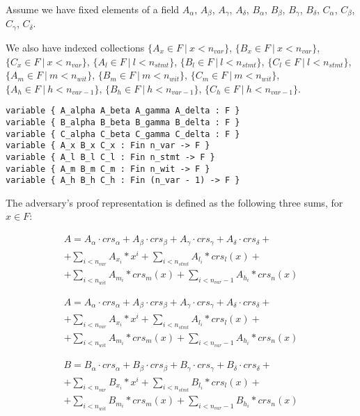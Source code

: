\documentclass{article}
\theoremstyle{definition}
\theoremstyle{remark}
\begin{document}
Assume we have fixed elements of a field $A_{\alpha}$, $A_{\beta}$, $A_{\gamma}$, $A_{\delta}$, $B_{\alpha}$, $B_{\beta}$, $B_{\gamma}$, $B_{\delta}$, $C_{\alpha}$, $C_{\beta}$, $C_{\gamma}$, $C_{\delta}$.

We also have indexed collections $\{ A_x \in F \: | \: x < n_{var} \}$, $\{ B_x \in F \: | \: x < n_{var} \}$, $\{ C_x \in F \: | \: x < n_{var} \}$, $\{ A_l \in F \: | \: l < n_{stmt} \}$, $\{ B_l \in F \: | \: l < n_{stmt} \}$, $\{ C_l \in F \: | \: l < n_{stmt} \}$, $\{ A_m \in F \: | \: m < n_{wit} \}$, $\{ B_m \in F \: | \: m < n_{wit} \}$, $\{ C_m \in F \: | \: m < n_{wit} \}$, $\{ A_h \in F \: | \: h < n_{var - 1} \}$, $\{ B_h \in F \: | \: h < n_{var - 1} \}$, $\{ C_h \in F \: | \: h < n_{var - 1} \}$.

\begin{lstlisting}
variable { A_alpha A_beta A_gamma A_delta : F }
variable { B_alpha B_beta B_gamma B_delta : F }
variable { C_alpha C_beta C_gamma C_delta : F }
variable { A_x B_x C_x : Fin n_var -> F }
variable { A_l B_l C_l : Fin n_stmt -> F }
variable { A_m B_m C_m : Fin n_wit -> F }
variable { A_h B_h C_h : Fin (n_var - 1) -> F }
\end{lstlisting}

The adversary's proof representation is defined as the following three sums, for $x \in F$:

\begin{multline}
A = A_{\alpha} \cdot crs_{\alpha} + A_{\beta} \cdot crs_{\beta} + A_{\gamma} \cdot crs_{\gamma} + A_{\delta} \cdot crs_{\delta} + \\
    + \sum \limits_{i < n_{var}} A_{x_i} * x^i + \sum \limits_{i < n_{stmt}} A_{l_i} * crs_l(x) + \\
    + \sum \limits_{i < n_{wit}} A_{m_i} * crs_m(x) + \sum \limits_{i < n_{var} - 1} A_{h_i} * crs_n(x)
\end{multline}

\begin{multline}
A = A_{\alpha} \cdot crs_{\alpha} + A_{\beta} \cdot crs_{\beta} + A_{\gamma} \cdot crs_{\gamma} + A_{\delta} \cdot crs_{\delta} + \\
    + \sum \limits_{i < n_{var}} A_{x_i} * x^i + \sum \limits_{i < n_{stmt}} A_{l_i} * crs_l(x) + \\
    + \sum \limits_{i < n_{wit}} A_{m_i} * crs_m(x) + \sum \limits_{i < n_{var} - 1} A_{h_i} * crs_n(x)
\end{multline}

\begin{multline}
B = B_{\alpha} \cdot crs_{\alpha} + B_{\beta} \cdot crs_{\beta} + B_{\gamma} \cdot crs_{\gamma} + B_{\delta} \cdot crs_{\delta} + \\
    + \sum \limits_{i < n_{var}} B_{x_i} * x^i + \sum \limits_{i < n_{stmt}} B_{l_i} * crs_l(x) + \\
    + \sum \limits_{i < n_{wit}} B_{m_i} * crs_m(x) + \sum \limits_{i < n_{var} - 1} B_{h_i} * crs_n(x)
\end{multline}
\end{document}
